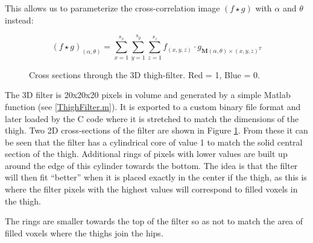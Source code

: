 This allows us to parameterize the cross-correlation image $(f \star g)$ with $\alpha$ and $\theta$ instead:

\begin{equation}
	(f \star g)_{(\alpha,\theta)} = \sum_{x=1}^{s_{x}} \sum_{y=1}^{s_{y}} \sum_{z=1}^{s_{z}} f_{(x,y,z)} \cdot g_{\mathbf{M}(\alpha,\theta) \times (x,y,z)^T}
	\label{eqn:CrossCorrelation}
\end{equation}


\begin{figure}[tb]
	\centering
	\quad
	\caption{Cross sections through the 3D thigh-filter.  Red = 1, Blue = 0.}
	\label{ThighFilterCrossSections}
\end{figure}

\bigskip
\noindent The 3D filter is 20x20x20 pixels in volume and generated by a simple Matlab function (see \ref{ThighFilter.m}).
It is exported to a custom binary file format and later loaded by the C code where it is stretched to match the dimensions of the thigh.
Two 2D cross-sections of the filter are shown in Figure \ref{ThighFilterCrossSections}.
From these it can be seen that the filter has a cylindrical core of value 1 to match the solid central section of the thigh.
Additional rings of pixels with lower values are built up around the edge of this cylinder towards the bottom.
The idea is that the filter will then fit ``better'' when it is placed exactly in the center if the thigh,
as this is where the filter pixels with the highest values will correspond to filled voxels in the thigh.

The rings are smaller towards the top of the filter so as not to match the area of filled voxels where the thighs join the hips.

